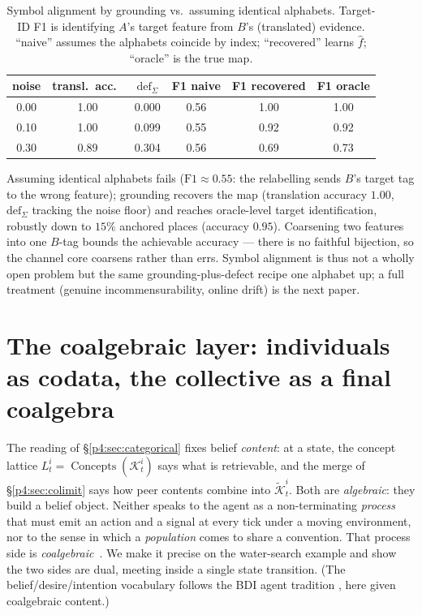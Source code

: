 \documentclass{article}
\begin{document}
\begin{table}[h]
\caption{Symbol alignment by grounding vs.\ assuming identical alphabets.
Target-ID F1 is identifying $A$'s target feature from $B$'s (translated)
evidence. ``naive'' assumes the alphabets coincide by index; ``recovered''
learns $\hat f$; ``oracle'' is the true map.}
\label{p4:tab:symbol-alignment}
\centering
\small
\begin{tabular}{c c c c c c}
\toprule
noise & transl.\ acc.\ & $\mathrm{def}_\Sigma$ & F1 naive & F1 recovered & F1 oracle \\
\midrule
0.00 & 1.00 & 0.000 & 0.56 & 1.00 & 1.00 \\
0.10 & 1.00 & 0.099 & 0.55 & 0.92 & 0.92 \\
0.30 & 0.89 & 0.304 & 0.56 & 0.69 & 0.73 \\
\bottomrule
\end{tabular}
\end{table}

Assuming identical alphabets fails ($\text{F1}\approx0.55$: the relabelling
sends $B$'s target tag to the wrong feature); grounding recovers the map
(translation accuracy $1.00$, $\mathrm{def}_\Sigma$ tracking the noise floor)
and reaches oracle-level target identification, robustly down to $15\%$
anchored places (accuracy $0.95$). Coarsening two features into one $B$-tag
bounds the achievable accuracy --- there is no faithful bijection, so the
channel core coarsens rather than errs. Symbol alignment is thus not a wholly
open problem but the same grounding-plus-defect recipe one alphabet up; a full
treatment (genuine incommensurability, online drift) is the next paper.


\section{The coalgebraic layer: individuals as codata, the collective as a final coalgebra}
\label{p4:sec:coalgebra}

The reading of \S\ref{p4:sec:categorical} fixes belief \emph{content}: at a
state, the concept lattice $L_t^i=\operatorname{Concepts}(\mathcal{K}_t^i)$
says what is retrievable, and the merge of \S\ref{p4:sec:colimit} says how peer
contents combine into $\widetilde{\mathcal K}_t^i$. Both are
\emph{algebraic}: they build a belief object. Neither speaks to the agent as
a non-terminating \emph{process} that must emit an action and a signal at
every tick under a moving environment, nor to the sense in which a
\emph{population} comes to share a convention. That process side is
\emph{coalgebraic}~\citep{rutten2000universal,jacobs2016coalgebra}. We make it precise on the water-search example and show
the two sides are dual, meeting inside a single state transition. (The
belief/desire/intention vocabulary follows the BDI agent tradition
\citep{rao1995bdi}, here given coalgebraic content.)
\end{document}
